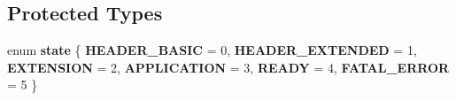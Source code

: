 \subsection*{Protected Types}
\begin{DoxyCompactItemize}
\item 
\mbox{\label{classwebsocketpp_1_1processor_1_1hybi13_a56fee5ffbb0b5c2c0708be2338e0740d}} 
enum {\bfseries state} \{ \newline
{\bfseries H\+E\+A\+D\+E\+R\+\_\+\+B\+A\+S\+IC} = 0, 
{\bfseries H\+E\+A\+D\+E\+R\+\_\+\+E\+X\+T\+E\+N\+D\+ED} = 1, 
{\bfseries E\+X\+T\+E\+N\+S\+I\+ON} = 2, 
{\bfseries A\+P\+P\+L\+I\+C\+A\+T\+I\+ON} = 3, 
\newline
{\bfseries R\+E\+A\+DY} = 4, 
{\bfseries F\+A\+T\+A\+L\+\_\+\+E\+R\+R\+OR} = 5
 \}
\end{DoxyCompactItemize}
